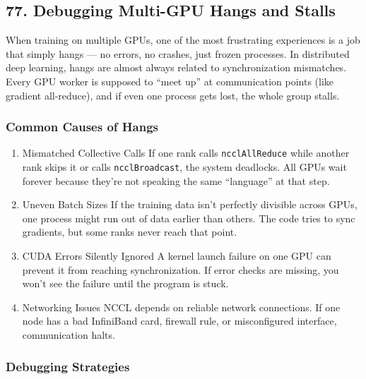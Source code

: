 \documentclass[
  letterpaper,
  DIV=11,
  numbers=noendperiod]{scrreprt}
\begin{document}
\subsection{77. Debugging Multi-GPU Hangs and
Stalls}\label{debugging-multi-gpu-hangs-and-stalls}

When training on multiple GPUs, one of the most frustrating experiences
is a job that simply hangs --- no errors, no crashes, just frozen
processes. In distributed deep learning, hangs are almost always related
to synchronization mismatches. Every GPU worker is supposed to ``meet
up'' at communication points (like gradient all-reduce), and if even one
process gets lost, the whole group stalls.

\subsubsection{Common Causes of Hangs}\label{common-causes-of-hangs}

\begin{enumerate}
\def\labelenumi{\arabic{enumi}.}
\item
  Mismatched Collective Calls If one rank calls \texttt{ncclAllReduce}
  while another rank skips it or calls \texttt{ncclBroadcast}, the
  system deadlocks. All GPUs wait forever because they're not speaking
  the same ``language'' at that step.
\item
  Uneven Batch Sizes If the training data isn't perfectly divisible
  across GPUs, one process might run out of data earlier than others.
  The code tries to sync gradients, but some ranks never reach that
  point.
\item
  CUDA Errors Silently Ignored A kernel launch failure on one GPU can
  prevent it from reaching synchronization. If error checks are missing,
  you won't see the failure until the program is stuck.
\item
  Networking Issues NCCL depends on reliable network connections. If one
  node has a bad InfiniBand card, firewall rule, or misconfigured
  interface, communication halts.
\end{enumerate}

\subsubsection{Debugging Strategies}\label{debugging-strategies}
\end{document}
